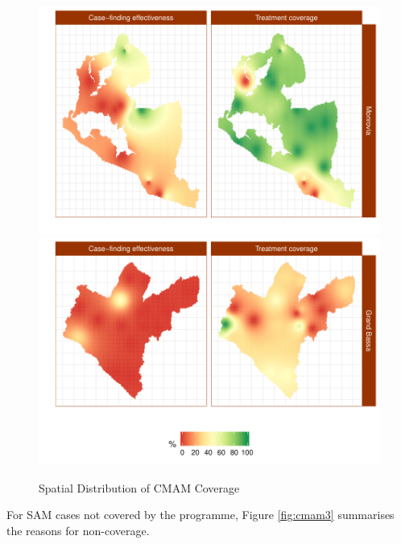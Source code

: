 \documentclass[12pt,a4paper]{article}
\begin{document}
\begin{figure}[H]

{\centering \includegraphics{liberiaCoverageReport_files/figure-latex/cmamMap-1} \includegraphics{liberiaCoverageReport_files/figure-latex/cmamMap-2} 

}

\caption{Spatial Distribution of CMAM Coverage}\label{fig:cmamMap}
\end{figure}

For SAM cases not covered by the programme, Figure \ref{fig:cmam3} summarises the reasons for non-coverage.
\end{document}
